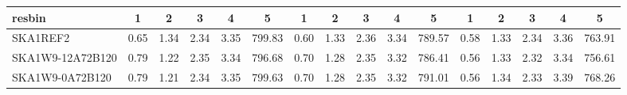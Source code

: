 \begin{table}[!htp]
{{\begin{tabular}{|lccccc||ccccc||ccccc|}
 resbin  &1 & 2 & 3 & 4 & 5 & 1 & 2 & 3 & 4 & 5 & 1 & 2 & 3 & 4 & 5 \\ \hline
SKA1REF2 & 0.65 \cellcolor{blue!18.00} & 1.34 \cellcolor{red!60.00} & 2.34 \cellcolor{green!18.00} & 3.35 \cellcolor{orange!54.63} & 799.83 \cellcolor{purple!60.00} & 0.60 \cellcolor{blue!18.00} & 1.33 \cellcolor{red!60.00} & 2.36 \cellcolor{green!60.00} & 3.34 \cellcolor{orange!60.00} & 789.57 \cellcolor{purple!46.85} & 0.58 \cellcolor{blue!60.00} & 1.33 \cellcolor{red!36.00} & 2.34 \cellcolor{green!60.00} & 3.36 \cellcolor{orange!33.00} & 763.91 \cellcolor{purple!44.33}\\ \hline 
SKA1W9-12A72B120 & 0.79 \cellcolor{blue!58.73} & 1.22 \cellcolor{red!22.07} & 2.35 \cellcolor{green!60.00} & 3.34 \cellcolor{orange!18.00} & 796.68 \cellcolor{purple!18.00} & 0.70 \cellcolor{blue!59.31} & 1.28 \cellcolor{red!20.60} & 2.35 \cellcolor{green!18.00} & 3.32 \cellcolor{orange!18.00} & 786.41 \cellcolor{purple!18.00} & 0.56 \cellcolor{blue!23.23} & 1.33 \cellcolor{red!18.00} & 2.32 \cellcolor{green!18.00} & 3.34 \cellcolor{orange!18.00} & 756.61 \cellcolor{purple!18.00}\\ \hline 
SKA1W9-0A72B120 & 0.79 \cellcolor{blue!60.00} & 1.21 \cellcolor{red!18.00} & 2.34 \cellcolor{green!20.14} & 3.35 \cellcolor{orange!60.00} & 799.63 \cellcolor{purple!57.29} & 0.70 \cellcolor{blue!60.00} & 1.28 \cellcolor{red!18.00} & 2.35 \cellcolor{green!34.13} & 3.32 \cellcolor{orange!22.16} & 791.01 \cellcolor{purple!60.00} & 0.56 \cellcolor{blue!18.00} & 1.34 \cellcolor{red!60.00} & 2.33 \cellcolor{green!45.83} & 3.39 \cellcolor{orange!60.00} & 768.26 \cellcolor{purple!60.00}\\ \hline 
\end{tabular}}
\hspace{1cm} 
}
\end{table}
